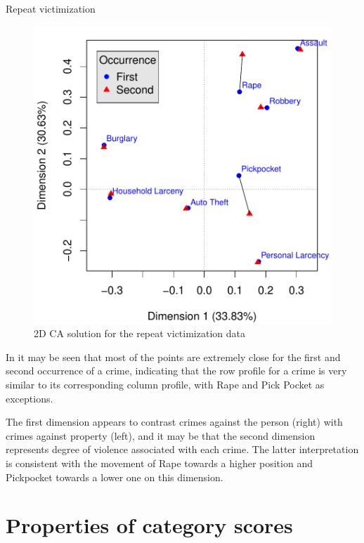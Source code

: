 \documentclass[11pt]{book}
\renewenvironment{knitrout}{\small\renewcommand{\baselinestretch}{.85}}{} %
\begin{document}
\begin{Example}[victims2]{Repeat victimization}
\begin{knitrout}
\begin{figure}[!htb]
\centerline{\includegraphics{ch06/fig/ca-victims-plot} }

\caption[2D CA solution for the repeat victimization data]{2D CA solution for the repeat victimization data\label{fig:ca-victims-plot}}
\end{figure}


\end{knitrout}

In  it may be seen that most of the points are
extremely close for the first and second occurrence of a crime,  indicating
that the row profile for a crime is very similar to its corresponding column
profile, with Rape and Pick Pocket as exceptions.

The first dimension appears to contrast crimes against the person (right) with
crimes against property (left), and it may be that the second dimension
represents degree of violence associated with each crime.
The latter interpretation is consistent with the movement of Rape towards
a higher position and Pickpocket towards a lower one on this dimension.


\end{Example}


\section{Properties of category scores}\label{sec:ca-scores}
\end{document}
